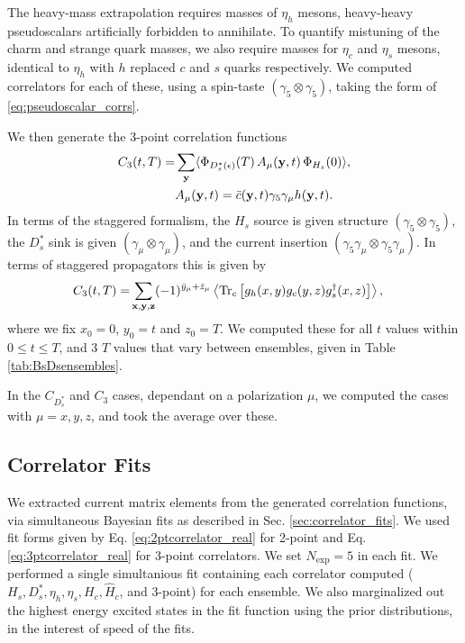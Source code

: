 The heavy-mass extrapolation requires masses of $\eta_h$ mesons, heavy-heavy pseudoscalars artificially forbidden to annihilate. To quantify mistuning of the charm and strange quark masses, we also require masses for $\eta_c$ and $\eta_s$ mesons, identical to $\eta_h$ with $h$ replaced $c$ and $s$ quarks respectively. We computed correlators for each of these, using a spin-taste $(\gamma_5\otimes \gamma_5)$, taking the form of \eqref{eq:pseudoscalar_corrs}.

We then generate the 3-point correlation functions
\begin{align}
  C_3(t,T) =& \sum_{{\bf{y}}} \langle \Phi_{D_s^*(\epsilon)}(T)\, A_{\mu}({\bf{y}},t) \,\Phi_{H_s}(0) \rangle, \\
  &A_{\mu}({\bf{y}},t) = \bar{c}({\bf{y}},t) \gamma_5\gamma_{\mu} h({\bf{y}},t). \nonumber
\end{align}
In terms of the staggered formalism, the $H_s$ source is given structure $(\gamma_5\otimes \gamma_5)$, the $D_s^*$ sink is given $(\gamma_{\mu}\otimes \gamma_{\mu})$, and the current insertion $(\gamma_5\gamma_{\mu}\otimes \gamma_5\gamma_{\mu})$. In terms of staggered propagators this is given by
\begin{align}
  C_3(t,T) =& \sum_{{\bf{x},\bf{y},\bf{z}}} (-1)^{\bar{y}_{\mu}+\bar{z}_{\mu}}\left\langle \text{Tr}_c\left[ g_h(x,y)g_c(y,z) g^{\dagger}_s(x,z) \right] \right\rangle,
\end{align}
where we fix $x_0 = 0$, $y_0=t$ and $z_0=T$. We computed these for all $t$ values within $0\leq t\leq T$, and 3 $T$ values that vary between ensembles, given in Table \ref{tab:BsDsensembles}.

In the $C_{D_s^*}$ and $C_3$ cases, dependant on a polarization $\mu$, we computed the cases with $\mu = x,y,z$, and took the average over these.

\subsection{Correlator Fits}
\label{sec:BsDsstar_fits}

We extracted current matrix elements from the generated correlation functions, via simultaneous Bayesian fits as described in Sec. \ref{sec:correlator_fits}. We used fit forms given by Eq. \eqref{eq:2ptcorrelator_real} for 2-point and Eq. \eqref{eq:3ptcorrelator_real} for 3-point correlators. We set $N_{\text{exp}}=5$ in each fit. We performed a single simultanious fit containing each correlator computed ($H_s,D_s^*,\eta_h,\eta_s,H_c,\hat{H}_c$, and 3-point) for each ensemble. We also marginalized out the highest energy excited states in the fit function using the prior distributions, in the interest of speed of the fits.


